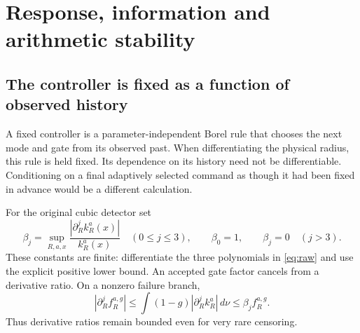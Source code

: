 \section{Response, information and arithmetic stability}\label{sec:response}
\subsection{The controller is fixed as a function of observed history}
A fixed controller is a parameter-independent Borel rule that chooses the next mode and gate from its observed past. When differentiating the physical radius, this rule is held fixed. Its dependence on its history need not be differentiable. Conditioning on a final adaptively selected command as though it had been fixed in advance would be a different calculation.

For the original cubic detector set
\[
 \beta_j=\sup_{R,a,x}\frac{|\partial_R^jk_R^a(x)|}{k_R^a(x)}\quad(0\le j\le3),
 \qquad \beta_0=1,\qquad\beta_j=0\quad(j>3).
\]
These constants are finite: differentiate the three polynomials in \eqref{eq:raw} and use the explicit positive lower bound. An accepted gate factor cancels from a derivative ratio. On a nonzero failure branch,
\[
 |\partial_R^j f_R^{a,g}|\le\int(1-g)|\partial_R^jk_R^a|\,d\nu
 \le\beta_j f_R^{a,g}.
\]
Thus derivative ratios remain bounded even for very rare censoring.

